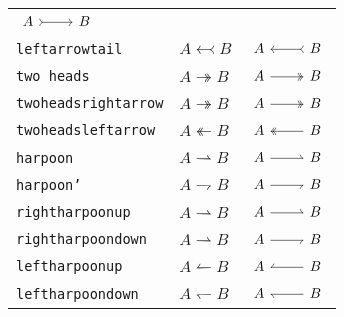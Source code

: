 \documentclass{scrartcl}
\newcommand{\tipname}{\texttt}
\begin{document}
\begin{longtable}{l@{\qquad}l@{\qquad}l}
	$\begin{tikzcd} A \arrow[rightarrowtail]{r} & B \end{tikzcd}$
	\\
	\tipname{leftarrowtail}
	&
	$A \leftarrowtail B$
	&
	$\begin{tikzcd} A \arrow[leftarrowtail]{r} & B \end{tikzcd}$
	\\
	\midrule
	\tipname{two heads}
	&
	$A \twoheadrightarrow B$
	&
	$\begin{tikzcd} A \arrow[two heads]{r} & B \end{tikzcd}$
	\\
	\tipname{twoheadsrightarrow}
	&
	$A \twoheadrightarrow B$
	&
	$\begin{tikzcd} A \arrow[twoheadrightarrow]{r} & B \end{tikzcd}$
	\\
	\tipname{twoheadsleftarrow}
	&
	$A \twoheadleftarrow B$
	&
	$\begin{tikzcd} A \arrow[twoheadleftarrow]{r} & B \end{tikzcd}$
	\\
	\midrule
	\tipname{harpoon}
	&
	$A \rightharpoonup B$
	&
	$\begin{tikzcd} A \arrow[harpoon]{r} & B \end{tikzcd}$
	\\
	\tipname{harpoon'}
	&
	$A \rightharpoondown B$
	&
	$\begin{tikzcd} A \arrow[harpoon']{r} & B \end{tikzcd}$
	\\
	\tipname{rightharpoonup}
	&
	$A \rightharpoonup B$
	&
	$\begin{tikzcd} A \arrow[rightharpoonup]{r} & B \end{tikzcd}$
	\\
	\tipname{rightharpoondown}
	&
	$A \rightharpoonup B$
	&
	$\begin{tikzcd} A \arrow[rightharpoondown]{r} & B \end{tikzcd}$
	\\
	\tipname{leftharpoonup}
	&
	$A \leftharpoonup B$
	&
	$\begin{tikzcd} A \arrow[leftharpoonup]{r} & B \end{tikzcd}$
	\\
	\tipname{leftharpoondown}
	&
	$A \leftharpoondown B$
	&
	$\begin{tikzcd} A \arrow[leftharpoondown]{r} & B \end{tikzcd}$
	\\

\end{longtable}
\end{document}
